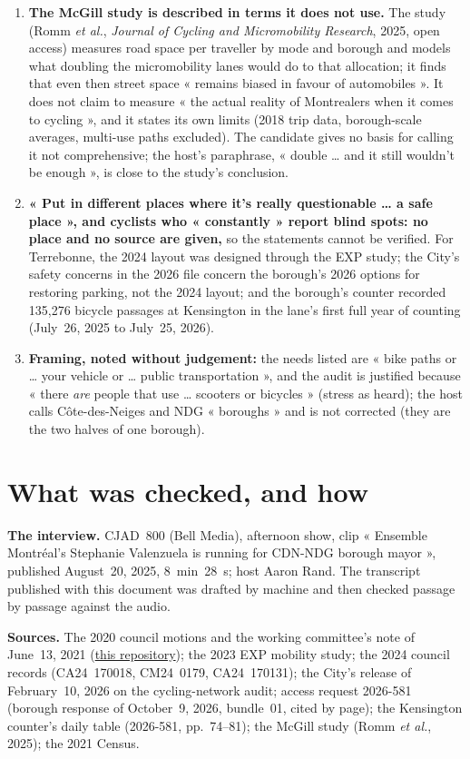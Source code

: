 \documentclass[11pt,letterpaper]{article}
\newcommand{\repourl}{https://github.com/OpenMobilityData/Terrebonne-open-sources}
\newcommand{\doc}[2]{\href{\repourl/blob/main/#1}{#2}}
\begin{document}
\begin{enumerate}[nosep]
\item \textbf{The McGill study is described in terms it does not use.} The study (Romm \emph{et al.}, \emph{Journal of Cycling and Micromobility Research}, 2025, open access) measures road space per traveller by mode and borough and models what doubling the micromobility lanes would do to that allocation; it finds that even then street space « remains biased in favour of automobiles ». It does not claim to measure « the actual reality of Montrealers when it comes to cycling », and it states its own limits (2018 trip data, borough-scale averages, multi-use paths excluded). The candidate gives no basis for calling it not comprehensive; the host's paraphrase, « double … and it still wouldn't be enough », is close to the study's conclusion.
\item \textbf{« Put in different places where it's really questionable … a safe place », and cyclists who « constantly » report blind spots: no place and no source are given,} so the statements cannot be verified. For Terrebonne, the 2024 layout was designed through the EXP study; the City's safety concerns in the 2026 file concern the borough's 2026 options for restoring parking, not the 2024 layout; and the borough's counter recorded 135,276 bicycle passages at Kensington in the lane's first full year of counting (July~26, 2025 to July~25, 2026).
\item \textbf{Framing, noted without judgement:} the needs listed are « bike paths or … your vehicle or … public transportation », and the audit is justified because « there \emph{are} people that use … scooters or bicycles » (stress as heard); the host calls Côte-des-Neiges and NDG « boroughs » and is not corrected (they are the two halves of one borough).
\end{enumerate}

\section{What was checked, and how}

\textbf{The interview.} CJAD~800 (Bell Media), afternoon show, clip
« Ensemble Montréal's Stephanie Valenzuela is running for CDN-NDG borough
mayor », published August~20, 2025, 8~min~28~s; host Aaron Rand. The
transcript published with this document was drafted by machine and then
checked passage by passage against the audio.

\textbf{Sources.} The 2020 council motions and the working committee's note
of June~13, 2021 (\doc{2020-2021-working-committee/}{this repository}); the
2023 EXP mobility study; the 2024 council records (CA24~170018, CM24~0179,
CA24~170131); the City's release of February~10, 2026 on the cycling-network
audit; access request 2026-581 (borough response of October~9, 2026,
bundle~01, cited by page); the Kensington counter's daily table (2026-581,
pp.~74--81); the McGill study (Romm \emph{et al.}, 2025); the 2021 Census.
\end{document}
